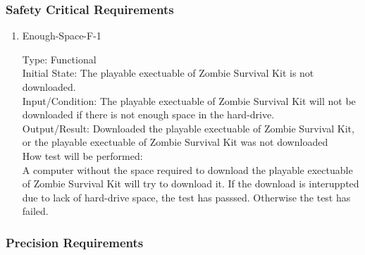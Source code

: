 \documentclass[12pt, titlepage]{article}
\newcounter{ftnum}
\newcounter{nftnum}
\begin{document}
\subsubsection{Safety Critical Requirements}

\begin{enumerate}
	
	\item{Enough-Space-F-1\\}  \label{NF9}
	
	Type: Functional\\
	
	Initial State: The playable exectuable of Zombie Survival Kit is not downloaded.\\
	
	Input/Condition: The playable exectuable of Zombie Survival Kit will not be downloaded if there is not enough space in the hard-drive. \\
	
	Output/Result: Downloaded the playable exectuable of Zombie Survival Kit, or the playable exectuable of Zombie Survival Kit was not downloaded\\
	
	How test will be performed:\\ A computer without the space required to download the playable exectuable of Zombie Survival Kit will try to download it. If the download is interuppted due to lack of hard-drive space, the test has passsed. Otherwise the test has failed. \\
	
\end{enumerate}

\subsubsection{Precision Requirements}
\end{document}
